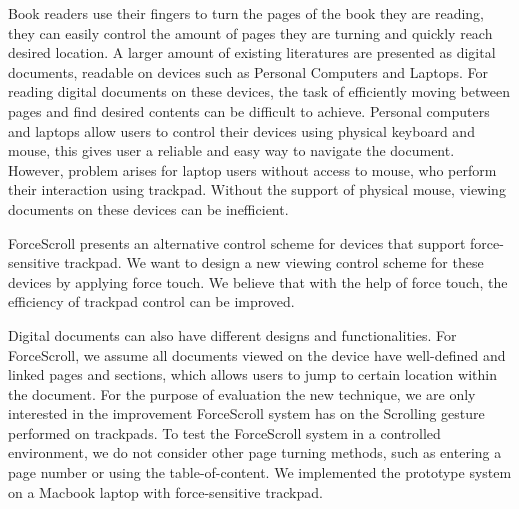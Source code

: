 \documentclass{sigchi}
\begin{document}
Book readers use their fingers to turn the pages of the book they are reading, they can easily control the amount of pages they are turning and quickly reach desired location. A larger amount of existing literatures are presented as digital documents, readable on devices such as Personal Computers and Laptops. For reading digital documents on these devices, the task of efficiently moving between pages and find desired contents can be difficult to achieve. Personal computers and laptops allow users to control their devices using physical keyboard and mouse, this gives user a reliable and easy way to navigate the document. However, problem arises for laptop users without access to mouse, who perform their interaction using trackpad. Without the support of physical mouse, viewing documents on these devices can be inefficient. 



ForceScroll presents an alternative control scheme for devices that support force-sensitive trackpad. We want to design a new viewing control scheme for these devices by applying force touch. We believe that with the help of force touch, the efficiency of trackpad control can be improved. 


Digital documents can also have different designs and functionalities. For ForceScroll, we assume all documents viewed on the device have well-defined and linked pages and sections, which allows users to jump to certain location within the document. For the purpose of evaluation the new technique, we are only interested in the improvement ForceScroll system has on the Scrolling gesture performed on trackpads. To test the ForceScroll system in a controlled environment, we do not consider other page turning methods, such as entering a page number or using the table-of-content. We implemented the prototype system on a Macbook laptop with force-sensitive trackpad.    
  
\end{document}
